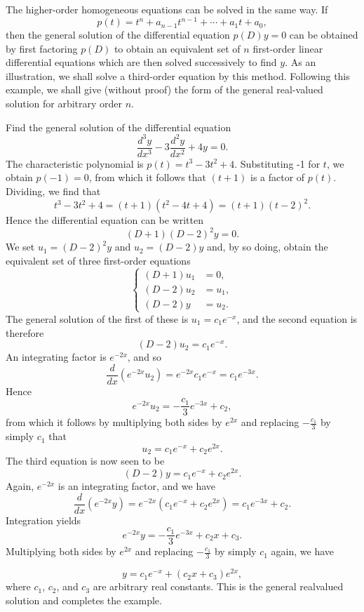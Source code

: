 The higher-order homogeneous equations can be solved in the same way. If 
$$
p(t) = t^n + a_{n-1}t^{n-1} + \cdots + a_1t + a_0,
$$
then the general solution of the differential equation $p(D)y = 0$ can be obtained by first factoring $p(D)$ to obtain an equivalent set of $n$ first-order linear differential equations which are then solved successively to find $y$. As an illustration, we shall solve a third-order equation by this method. Following this example, we shall give (without proof) the form of the general real-valued solution for arbitrary order $n$.
\begin{example} Find the general solution of the differential equation
$$
\frac{d^3y}{dx^3} - 3 \frac{d^2y}{dx^2} + 4y = 0. 
$$
The characteristic polynomial is $p(t) = t^3 - 3t^2 + 4$. Substituting -1 for
$t$, we obtain $p(-1) = 0$, from which it follows that $(t + 1)$ is a factor of $p(t)$. Dividing, we find that 
$$
t^3 - 3t^2 + 4 = (t + 1)(t^2 - 4t + 4) = (t + 1)(t - 2)^2. 
$$
Hence the differential equation can be written 
$$
(D + 1)(D - 2)^2 y = 0. 
$$
We set $u_1 = (D - 2)^2y$ and $u_2 = (D - 2)y$ and, by so doing, obtain the equivalent set of three first-order equations
$$
\left \{ \begin{array}{rl}
(D + 1)u_1 &= 0, \\
(D - 2)u_2 &= u_1,\\
    (D - 2)y &= u_2 .
\end{array}
\right .
$$
The general solution of the first of these is $u_1 = c_1e^{-x}$, and the second equation is therefore
$$
(D - 2)u_2 = c_1e^{-x}. 
$$
An integrating factor is $e^{-2x}$, and so
$$
\frac{d}{dx} (e^{-2x} u_2) = e^{-2x} c_1 e^{-x} = c_1e^{-3x}.
$$
Hence
$$
e^{-2x} u_2 = -\frac{c_1}{3} e^{-3x}  + c_2, 
$$
from which it follows by multiplying both sides by $e^{2x}$ and replacing $-\frac{c_1}{3}$ by simply $c_1$ that  
$$
u_2 = c_1e^{-x} + c_2e^{2x}.
$$
The third equation is now seen to be 
$$
(D - 2)y = c_1e^{-x} + c_2e^{2x} .
$$ 
Again, $e^{-2x}$ is an integrating factor, and we have
$$
\frac{d}{dx} (e^{-2x}y) = e^{-2x}(c_1e^{-x} + c_2e^{2x}) = c_1e^{-3x} + c_2.
$$
Integration yields
$$
e^{-2x} y = -\frac{c_1}{3} e^{-3x} + c_2x + c_3.
$$
Multiplying both sides by $e^{2x}$ and replacing $-\frac{c_1}{3}$ by simply $c_1$ again, we have 

$$
y = c_1e^{-x} + (c_2x + c_3)e^{2x},
$$
where $c_1$, $c_2$, and $c_3$ are arbitrary real constants. This is the general realvalued solution and completes the example.
\end{example}

